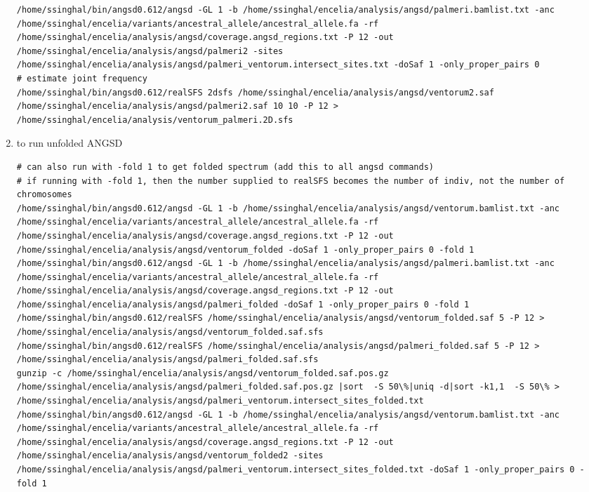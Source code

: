 \documentclass[idxtotoc,hyperref,openany,oneside]{labbook} %
\begin{document}
\begin{enumerate}
\begin{verbatim}
/home/ssinghal/bin/angsd0.612/angsd -GL 1 -b /home/ssinghal/encelia/analysis/angsd/palmeri.bamlist.txt -anc /home/ssinghal/encelia/variants/ancestral_allele/ancestral_allele.fa -rf /home/ssinghal/encelia/analysis/angsd/coverage.angsd_regions.txt -P 12 -out /home/ssinghal/encelia/analysis/angsd/palmeri2 -sites /home/ssinghal/encelia/analysis/angsd/palmeri_ventorum.intersect_sites.txt -doSaf 1 -only_proper_pairs 0
# estimate joint frequency
/home/ssinghal/bin/angsd0.612/realSFS 2dsfs /home/ssinghal/encelia/analysis/angsd/ventorum2.saf /home/ssinghal/encelia/analysis/angsd/palmeri2.saf 10 10 -P 12 > /home/ssinghal/encelia/analysis/ventorum_palmeri.2D.sfs
\end{verbatim}
\item to run unfolded ANGSD
\begin{verbatim}
# can also run with -fold 1 to get folded spectrum (add this to all angsd commands)
# if running with -fold 1, then the number supplied to realSFS becomes the number of indiv, not the number of chromosomes
/home/ssinghal/bin/angsd0.612/angsd -GL 1 -b /home/ssinghal/encelia/analysis/angsd/ventorum.bamlist.txt -anc /home/ssinghal/encelia/variants/ancestral_allele/ancestral_allele.fa -rf /home/ssinghal/encelia/analysis/angsd/coverage.angsd_regions.txt -P 12 -out /home/ssinghal/encelia/analysis/angsd/ventorum_folded -doSaf 1 -only_proper_pairs 0 -fold 1
/home/ssinghal/bin/angsd0.612/angsd -GL 1 -b /home/ssinghal/encelia/analysis/angsd/palmeri.bamlist.txt -anc /home/ssinghal/encelia/variants/ancestral_allele/ancestral_allele.fa -rf /home/ssinghal/encelia/analysis/angsd/coverage.angsd_regions.txt -P 12 -out /home/ssinghal/encelia/analysis/angsd/palmeri_folded -doSaf 1 -only_proper_pairs 0 -fold 1
/home/ssinghal/bin/angsd0.612/realSFS /home/ssinghal/encelia/analysis/angsd/ventorum_folded.saf 5 -P 12 > /home/ssinghal/encelia/analysis/angsd/ventorum_folded.saf.sfs
/home/ssinghal/bin/angsd0.612/realSFS /home/ssinghal/encelia/analysis/angsd/palmeri_folded.saf 5 -P 12 > /home/ssinghal/encelia/analysis/angsd/palmeri_folded.saf.sfs
gunzip -c /home/ssinghal/encelia/analysis/angsd/ventorum_folded.saf.pos.gz /home/ssinghal/encelia/analysis/angsd/palmeri_folded.saf.pos.gz |sort  -S 50\%|uniq -d|sort -k1,1  -S 50\% > /home/ssinghal/encelia/analysis/angsd/palmeri_ventorum.intersect_sites_folded.txt
/home/ssinghal/bin/angsd0.612/angsd -GL 1 -b /home/ssinghal/encelia/analysis/angsd/ventorum.bamlist.txt -anc /home/ssinghal/encelia/variants/ancestral_allele/ancestral_allele.fa -rf /home/ssinghal/encelia/analysis/angsd/coverage.angsd_regions.txt -P 12 -out /home/ssinghal/encelia/analysis/angsd/ventorum_folded2 -sites /home/ssinghal/encelia/analysis/angsd/palmeri_ventorum.intersect_sites_folded.txt -doSaf 1 -only_proper_pairs 0 -fold 1

\end{verbatim}
\end{enumerate}
\end{document}
